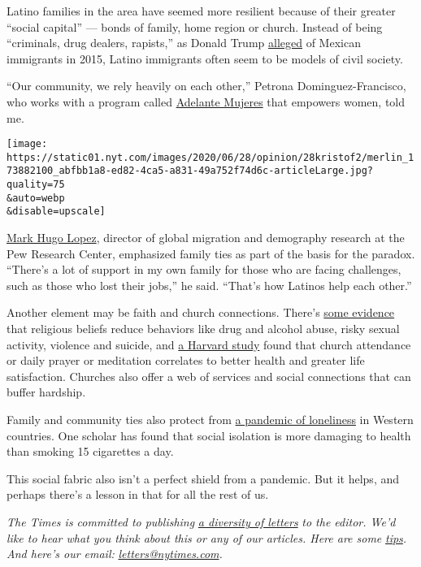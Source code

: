 Latino families in the area have seemed more resilient because of their
greater ``social capital'' --- bonds of family, home region or church.
Instead of being ``criminals, drug dealers, rapists,'' as Donald Trump
\href{https://www.washingtonpost.com/news/fact-checker/wp/2015/07/08/donald-trumps-false-comments-connecting-mexican-immigrants-and-crime/}{alleged}
of Mexican immigrants in 2015, Latino immigrants often seem to be models
of civil society.

``Our community, we rely heavily on each other,'' Petrona
Dominguez-Francisco, who works with a program called
\href{https://www.adelantemujeres.org/}{Adelante Mujeres} that empowers
women, told me.

\texttt{[image: https://static01.nyt.com/images/2020/06/28/opinion/28kristof2/merlin\_173882100\_abfbb1a8-ed82-4ca5-a831-49a752f74d6c-articleLarge.jpg?quality=75\\\&auto=webp\\\&disable=upscale]}

\href{https://www.pewresearch.org/staff/mark-hugo-lopez/}{Mark Hugo
Lopez}, director of global migration and demography research at the Pew
Research Center, emphasized family ties as part of the basis for the
paradox. ``There's a lot of support in my own family for those who are
facing challenges, such as those who lost their jobs,'' he said.
``That's how Latinos help each other.''

Another element may be faith and church connections. There's
\href{https://www.ncbi.nlm.nih.gov/pmc/articles/PMC4286922/}{some
evidence} that religious beliefs reduce behaviors like drug and alcohol
abuse, risky sexual activity, violence and suicide, and
\href{https://www.hsph.harvard.edu/news/press-releases/religious-upbringing-adult-health/}{a
Harvard study} found that church attendance or daily prayer or
meditation correlates to better health and greater life satisfaction.
Churches also offer a web of services and social connections that can
buffer hardship.

Family and community ties also protect from
\href{https://www.nytimes.com/2019/11/09/opinion/sunday/britain-loneliness-epidemic.html}{a
pandemic of loneliness} in Western countries. One scholar has found that
social isolation is more damaging to health than smoking 15 cigarettes a
day.

This social fabric also isn't a perfect shield from a pandemic. But it
helps, and perhaps there's a lesson in that for all the rest of us.

\emph{The Times is committed to publishing}
\href{https://www.nytimes.com/2019/01/31/opinion/letters/letters-to-editor-new-york-times-women.html}{\emph{a
diversity of letters}} \emph{to the editor. We'd like to hear what you
think about this or any of our articles. Here are some}
\href{https://help.nytimes.com/hc/en-us/articles/115014925288-How-to-submit-a-letter-to-the-editor}{\emph{tips}}\emph{.
And here's our email:}
\href{mailto:letters@nytimes.com}{\emph{letters@nytimes.com}}\emph{.}


